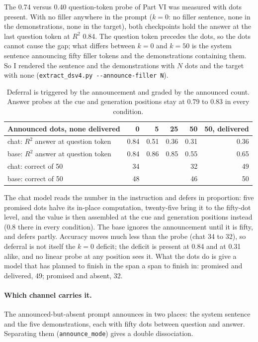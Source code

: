 \documentclass[11pt]{article}
\newcommand{\ttt}[1]{\texttt{\small #1}}
\begin{document}
The 0.74 versus 0.40 question-token probe of Part VI was measured with dots present. With no filler anywhere in the prompt ($k=0$: no filler sentence, none in the demonstrations, none in the target), both checkpoints hold the answer at the last question token at $R^2$ 0.84. The question token precedes the dots, so the dots cannot cause the gap; what differs between $k=0$ and $k=50$ is the system sentence announcing fifty filler tokens and the demonstrations containing them. So I rendered the sentence and the demonstrations with $N$ dots and the target with none (\ttt{extract\_dsv4.py -{}-announce-filler N}).

\begin{table}[h]\centering\small
\begin{tabular}{lrrrrr}\toprule
Announced dots, none delivered & 0 & 5 & 25 & 50 & 50, delivered \\ \midrule
chat: $R^2$ answer at question token & 0.84 & 0.51 & 0.36 & 0.31 & 0.36 \\
base: $R^2$ answer at question token & 0.84 & 0.86 & 0.85 & 0.55 & 0.65 \\
chat: correct of 50 & 34 & & & 32 & 49 \\
base: correct of 50 & 48 & & & 46 & 50 \\ \bottomrule
\end{tabular}
\caption{Deferral is triggered by the announcement and graded by the announced count. Answer probes at the cue and generation positions stay at 0.79 to 0.83 in every condition.}\end{table}

The chat model reads the number in the instruction and defers in proportion: five promised dots halve its in-place computation, twenty-five bring it to the fifty-dot level, and the value is then assembled at the cue and generation positions instead (0.8 there in every condition). The base ignores the announcement until it is fifty, and defers partly. Accuracy moves much less than the probe (chat 34 to 32), so deferral is not itself the $k=0$ deficit; the deficit is present at 0.84 and at 0.31 alike, and no linear probe at any position sees it. What the dots do is give a model that has planned to finish in the span a span to finish in: promised and delivered, 49; promised and absent, 32.

\paragraph{Which channel carries it.} The announced-but-absent prompt announces in two places: the system sentence and the five demonstrations, each with fifty dots between question and answer. Separating them (\ttt{announce\_mode}) gives a double dissociation.
\end{document}
